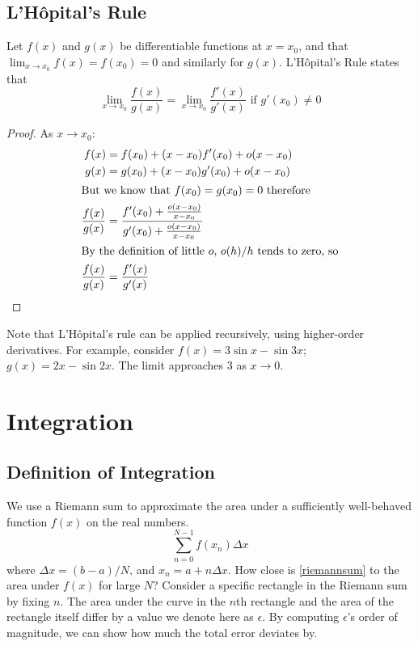 \documentclass{article}
\begin{document}
	\subsection{L'H\^opital's Rule}
	Let $f(x)$ and $g(x)$ be differentiable functions at $x=x_0$, and that $\lim_{x\to x_0} f(x) = f(x_0) = 0$ and similarly for $g(x)$. L'H\^opital's Rule states that
	\[ \lim_{x\to x_0} \frac{f(x)}{g(x)} = \lim_{x\to x_0} \frac{f'(x)}{g'(x)} \text{ if } g'(x_0) \neq 0 \]
	\begin{proof}
		As $x \to x_0$:
		\begin{align*}
			f(x) &= f(x_0) + (x-x_0) f'(x_0) + o(x-x_0) \\
			g(x) &= g(x_0) + (x-x_0) g'(x_0) + o(x-x_0) \\
			\intertext{But we know that $f(x_0)=g(x_0)=0$ therefore}
			\frac{f(x)}{g(x)} &= \frac{f'(x_0) + \frac{o(x-x_0)}{x-x_0}}{g'(x_0) + \frac{o(x-x_0)}{x-x_0}} \\
			\intertext{By the definition of little $o$, $o(h)/h$ tends to zero, so}
			\frac{f(x)}{g(x)} &= \frac{f'(x)}{g'(x)}
		\end{align*}
	\end{proof}
	Note that L'H\^opital's rule can be applied recursively, using higher-order derivatives. For example, consider $f(x) = 3\sin x - \sin 3x$; $g(x) = 2x - \sin 2x$. The limit approaches 3 as $x \to 0$.
	
	\section{Integration}
	\subsection{Definition of Integration}
	We use a Riemann sum to approximate the area under a sufficiently well-behaved function $f(x)$ on the real numbers.
	\begin{equation}\label{riemannsum}
		\sum_{n=0}^{N-1} f(x_n) \Delta x
	\end{equation}
	where $\Delta x = (b-a)/N$, and $x_n = a + n\Delta x$. How close is \eqref{riemannsum} to the area under $f(x)$ for large $N$? Consider a specific rectangle in the Riemann sum by fixing $n$. The area under the curve in the $n$th rectangle and the area of the rectangle itself differ by a value we denote here as $\epsilon$. By computing $\epsilon$'s order of magnitude, we can show how much the total error deviates by.
	
\end{document}
